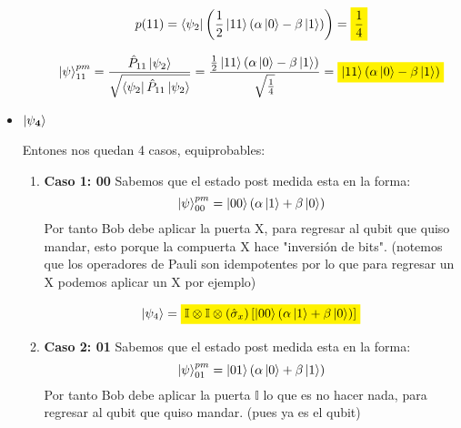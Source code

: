 \begin{itemize}
\begin{enumerate}[label=\arabic*.]
                \[
                    p(11) = \bra{\psi_2}\left(\frac{1}{2} \ket{11}
                    (\alpha\ket{0}-\beta\ket{1})\right) = \mathcolorbox{yellow}{\frac{1}{4}}
                \]

            \begin{align*}
                \ket{\psi}_{11}^{pm} = \frac{\hat{P}_{11}
                \ket{\psi_2}}{\sqrt{\bra{\psi_2}\hat{P}_{11} \ket{\psi_2}}} =
                \frac{\frac{1}{2} \ket{11}(\alpha\ket{0}-\beta\ket{1}) }{\sqrt{\frac{1}{4}}} =
                \mathcolorbox{yellow}{\ket{11}(\alpha\ket{0}-\beta\ket{1})}
            \end{align*}

            \vspace{.3cm}
        \end{enumerate}
    
    \item $\mathbf{\ket{\psi_4}}$\vspace{.3cm}

        Entones nos quedan 4 casos, equiprobables: \vspace{.3cm}

        \begin{enumerate}[label=\arabic*.]
            \item \textbf{Caso 1: 00}
                Sabemos que el estado post medida esta en la forma:
                \[
                    \ket{\psi}_{00}^{pm} = \ket{00} (\alpha\ket{1}+\beta\ket{0})  
                \]
                Por tanto Bob debe aplicar la puerta X, para regresar al qubit que quiso mandar,
                esto porque la compuerta X hace "inversión de bits".
                (notemos que los operadores de Pauli son idempotentes por lo que para regresar un X
                podemos aplicar un X por ejemplo)

                \[
                    \ket{\psi_4} = \mathcolorbox{yellow}{\mathbb{I} \otimes \mathbb{I} \otimes (\hat{\sigma}_x)
                    \left[ \ket{00} (\alpha\ket{1}+\beta\ket{0}) \right]}
                \]

                \vspace{.3cm}

            \item \textbf{Caso 2: 01}
                Sabemos que el estado post medida esta en la forma:
                \[
                    \ket{\psi}_{01}^{pm} = \ket{01} (\alpha\ket{0}+\beta\ket{1})
                \]
                Por tanto Bob debe aplicar la puerta $\mathbb{I}$ lo que es no hacer nada, para regresar al qubit que quiso
                mandar. (pues ya es el qubit)



\end{enumerate}
\end{itemize}
